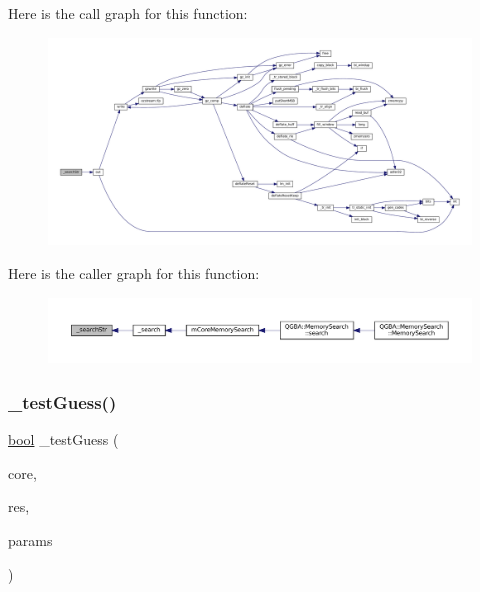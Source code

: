 Here is the call graph for this function\+:
\nopagebreak
\begin{figure}[H]
\begin{center}
\leavevmode
\includegraphics[width=350pt]{mem-search_8c_a3ed6b56c8b6b869abae56fc00b22fa4d_cgraph}
\end{center}
\end{figure}
Here is the caller graph for this function\+:
\nopagebreak
\begin{figure}[H]
\begin{center}
\leavevmode
\includegraphics[width=350pt]{mem-search_8c_a3ed6b56c8b6b869abae56fc00b22fa4d_icgraph}
\end{center}
\end{figure}
\mbox{\label{mem-search_8c_abe2e1ea41c6228bb5bcb7af4f001f543}} 
\subsubsection{\texorpdfstring{\+\_\+test\+Guess()}{\_testGuess()}}
{\footnotesize\ttfamily \mbox{\hyperlink{libretro_8h_a4a26dcae73fb7e1528214a068aca317e}{bool}} \+\_\+test\+Guess (\begin{DoxyParamCaption}\item[{struct m\+Core $\ast$}]{core,  }\item[{struct m\+Core\+Memory\+Search\+Result $\ast$}]{res,  }\item[{const struct m\+Core\+Memory\+Search\+Params $\ast$}]{params }\end{DoxyParamCaption})}

